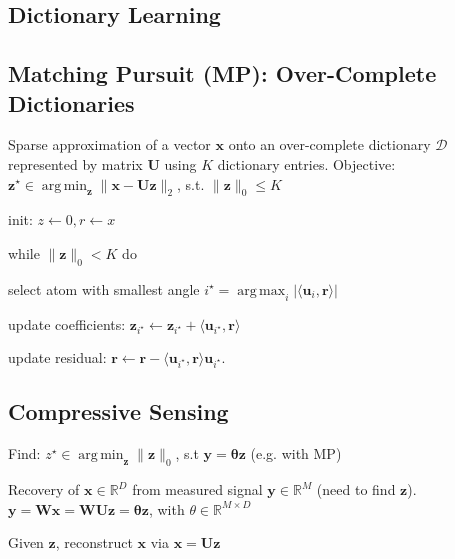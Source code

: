 \documentclass[a4paper, 11pt, landscape]{article}
\DeclareMathOperator*{\argmin}{arg\,min}
\DeclareMathOperator*{\argmax}{arg\,max}
\begin{document}
\begin{multicols*}{3}
\section{Dictionary Learning}

\subsection{Matching Pursuit (MP): Over-Complete Dictionaries}
Sparse approximation of a vector $\mathbf{x}$ onto an over-complete dictionary $\mathcal{D}$ represented by matrix $\mathbf{U}$ using $K$ dictionary entries.
Objective: $\mathbf{z}^\star \in \argmin_{\mathbf{z}} \|\mathbf{x} - \mathbf{Uz} \|_2$, s.t. $\|\mathbf{z}\|_0 \leq K$
\begin{compactenum}
	\item init: $z \leftarrow 0, r \leftarrow x$
	\item while $\|\mathbf{z}\|_0 < K$ do
	\item select atom with smallest angle $i^\star = \argmax_i |\langle \mathbf{u}_i, \mathbf{r} \rangle|$
	\item update coefficients: $\mathbf{z}_{i^\star} \leftarrow \mathbf{z}_{i^\star} + \langle \mathbf{u}_{i^\star}, \mathbf{r} \rangle$
	\item update residual: $\mathbf{r} \leftarrow \mathbf{r} - \langle \mathbf{u}_{i^\star}, \mathbf{r} \rangle \mathbf{u}_{i^\star}$.
\end{compactenum}

\subsection{Compressive Sensing}
\begin{compactitem}
  \item Find: $z^\star \in \argmin_{\mathbf{z}}\|\mathbf{z}\|_0$, s.t $\mathbf{y} = \mathbf{\theta z}$ (e.g. with MP)
  \item Recovery of $\mathbf{x} \in \mathbb{R}^D$ from measured signal $\mathbf{y} \in \mathbb{R}^M$ (need to find $\mathbf{z}$).
  $\mathbf{y} = \mathbf{Wx} = \mathbf{WUz} = \mathbf{\theta z}$, with $\theta \in \mathbb{R}^{M \times D}$
  \item Given $\mathbf{z}$, reconstruct $\mathbf{x}$ via $\mathbf{x} = \mathbf{Uz}$
\end{compactitem}


\end{multicols*}
\end{document}
